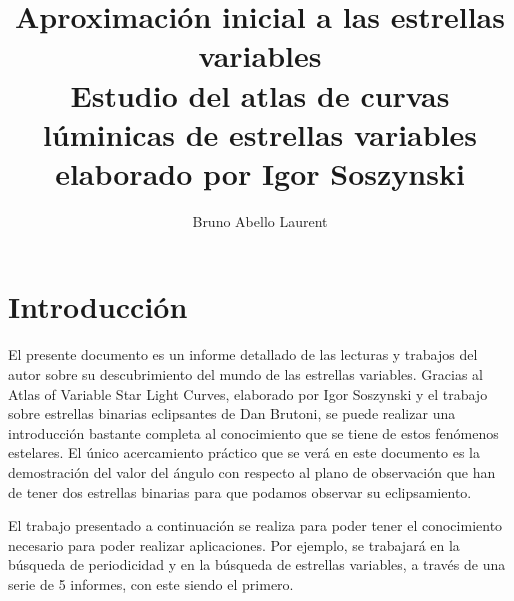 \documentclass[10pt,twocolumn]{article}
\title{\textbf{Aproximación inicial a las estrellas variables}\\Estudio del atlas de curvas lúminicas de estrellas variables elaborado por Igor Soszynski}
\author[1]{Bruno Abello Laurent}
\affil[1]{Universidad de Los Andes, Departamento de Física, Colombia}
\date{}
\begin{document}


\section{Introducción}

El presente documento es un informe detallado de las lecturas y trabajos del autor sobre su descubrimiento del mundo de las 
estrellas variables. Gracias al Atlas of Variable Star Light Curves, elaborado por Igor Soszynski y el trabajo sobre
estrellas binarias eclipsantes de Dan Brutoni, se puede realizar una introducción bastante completa al conocimiento que 
se tiene de estos fenómenos estelares. El único acercamiento práctico que se verá en este documento es la demostración 
del valor del ángulo con respecto al plano de observación que han de tener dos estrellas binarias para que podamos observar
su eclipsamiento.

El trabajo presentado a continuación se realiza para poder tener el conocimiento necesario para poder realizar aplicaciones.
Por ejemplo, se trabajará en la búsqueda de periodicidad y en la búsqueda de estrellas variables, a través de una serie de 
5 informes, con este siendo el primero. 
\end{document}
